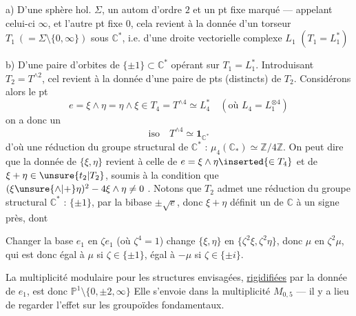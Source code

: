 a) D'une sphère hol. $\Sigma$, un autom \inserted{$\sigma$} d'ordre $2$
et un pt fixe marqué --- appelant celui-ci $\infty$, et l'autre pt fixe $0$,
cela revient à la donnée d'un torseur $T_1\ (= \Sigma\setminus\{0,\infty\})$
sous $\mathbb C^*$, i.e. d'une droite vectorielle complexe $L_1$
$(T_1=L_1^*)$

b) D'une paire d'orbites  de
$\{\pm1\}\subset\mathbb C^*$ opérant sur $T_1=L_1^*$.
Introduisant $T_2=T^{\wedge2}$, cel revient à la donnée d'une paire de pts
\inserted{$\{\xi,\eta\}$} (distincts) de $T_2$.
Considérons alors le pt
\[
 e=\xi\wedge\eta=\eta\wedge\xi
 \in T_4=T^{\wedge4}\simeq L_4^*
 \quad(\text{où }L_4=L_1^{\otimes4})
\]
on a donc un
\[
 \mathrm{iso}\quad T^{\wedge4}\simeq\mathbf1_{\mathbb C^*}
\]
d'où une réduction du groupe structural 
de $\mathbb C^*$ : $\mu_4(\mathbb C_*)\simeq\mathbb Z/4\mathbb Z$.
On peut dire que la donnée de $\{\xi,\eta\}$ revient à celle de
$e=\xi\wedge\eta\inserted{\in T_4}$ et de
$\xi+\eta\in\unsure{t_2|T_2}$, soumis à la condition que
$(\xi\unsure{\wedge|+}\eta)^2-4\xi\wedge\eta\ne0$ .
Notons 
que $T_2$ admet une réduction du groupe structural $\mathbb C^*$ :
$\{\pm1\}$, par la bibase $\pm\sqrt e$, donc $\xi+\eta$
définit un  de $\mathbb C$ à un signe près, dont


Changer la base  \(e_1\) en \(\zeta e_1\) (où \(\zeta^4=1\))
 change 
\(\{\xi,\eta\}\) en \(\{\zeta^2\xi,\zeta^2\eta\}\),
donc \(\mu\) en \(\zeta^2\mu\), qui est donc
égal à \(\mu\) si \(\zeta\in\{\pm1\}\), égal à \(-\mu\) si
\(\zeta\in\{\pm i\}\).

La multiplicité modulaire pour les
structures envisagées, \uline{rigidifiées} par la
donnée de \(e_1\), est donc \(\mathbb P^1\setminus\{0,\pm2,\infty\}\)
Elle s'envoie dans la multiplicité
\(M_{0,5}\) --- il y a lieu de regarder l'effet
sur les groupoïdes fondamentaux.

